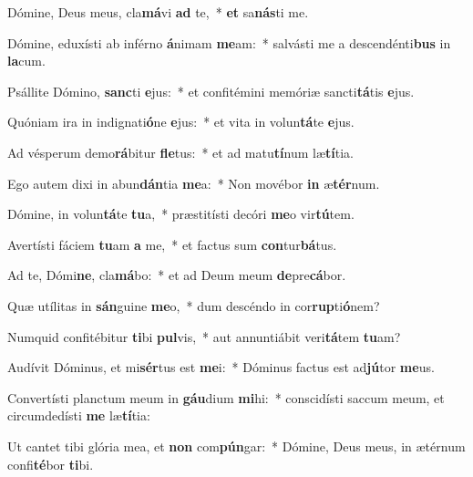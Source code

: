 \item Dómine, Deus meus, cla\textbf{má}vi \textbf{ad} te,~* \textbf{et} sa\textbf{nás}ti me.
\item Dómine, eduxísti ab inférno \textbf{á}nimam \textbf{me}am:~* salvásti me a descendénti\textbf{bus} in \textbf{la}cum.
\item Psállite Dómino, \textbf{sanc}ti \textbf{e}jus:~* et confitémini memóriæ sancti\textbf{tá}tis \textbf{e}jus.
\item Quóniam ira in indignati\textbf{ó}ne \textbf{e}jus:~* et vita in volun\textbf{tá}te \textbf{e}jus.
\item Ad vésperum demo\textbf{rá}bitur \textbf{fle}tus:~* et ad matu\textbf{tí}num læ\textbf{tí}tia.
\item Ego autem dixi in abun\textbf{dán}tia \textbf{me}a:~* Non movébor \textbf{in} æ\textbf{tér}num.
\item Dómine, in volun\textbf{tá}te \textbf{tu}a,~* præstitísti decóri \textbf{me}o vir\textbf{tú}tem.
\item Avertísti fáciem \textbf{tu}am \textbf{a} me,~* et factus sum \textbf{con}tur\textbf{bá}tus.
\item Ad te, Dómi\textbf{ne}, cla\textbf{má}bo:~* et ad Deum meum \textbf{de}pre\textbf{cá}bor.
\item Quæ utílitas in \textbf{sán}guine \textbf{me}o,~* dum descéndo in cor\textbf{rup}ti\textbf{ó}nem?
\item Numquid confitébitur \textbf{ti}bi \textbf{pul}vis,~* aut annuntiábit veri\textbf{tá}tem \textbf{tu}am?
\item Audívit Dóminus, et mi\textbf{sér}tus est \textbf{me}i:~* Dóminus factus est ad\textbf{jú}tor \textbf{me}us.
\item Convertísti planctum meum in \textbf{gáu}dium \textbf{mi}hi:~* conscidísti saccum meum, et circumdedísti \textbf{me} læ\textbf{tí}tia:
\item Ut cantet tibi glória mea, et \textbf{non} com\textbf{pún}gar:~* Dómine, Deus meus, in ætérnum confi\textbf{té}bor \textbf{ti}bi.
